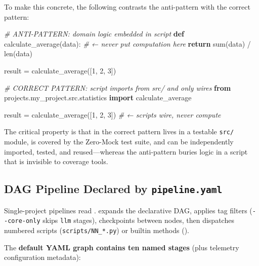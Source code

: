 \documentclass[
]{article}
\newenvironment{Shaded}{}{}
\newcommand{\BuiltInTok}[1]{\textcolor[rgb]{0.00,0.50,0.00}{#1}}
\newcommand{\CommentTok}[1]{\textcolor[rgb]{0.38,0.63,0.69}{\textit{#1}}}
\newcommand{\ControlFlowTok}[1]{\textcolor[rgb]{0.00,0.44,0.13}{\textbf{#1}}}
\newcommand{\DecValTok}[1]{\textcolor[rgb]{0.25,0.63,0.44}{#1}}
\newcommand{\ImportTok}[1]{\textcolor[rgb]{0.00,0.50,0.00}{\textbf{#1}}}
\newcommand{\KeywordTok}[1]{\textcolor[rgb]{0.00,0.44,0.13}{\textbf{#1}}}
\newcommand{\NormalTok}[1]{#1}
\newcommand{\OperatorTok}[1]{\textcolor[rgb]{0.40,0.40,0.40}{#1}}
\begin{document}
To make this concrete, the following contrasts the anti-pattern with the
correct pattern:

\begin{Shaded}
\begin{Highlighting}[]
\CommentTok{\# ANTI{-}PATTERN: domain logic embedded in script}
\KeywordTok{def}\NormalTok{ calculate\_average(data):          }\CommentTok{\# ← never put computation here}
    \ControlFlowTok{return} \BuiltInTok{sum}\NormalTok{(data) }\OperatorTok{/} \BuiltInTok{len}\NormalTok{(data)}

\NormalTok{result }\OperatorTok{=}\NormalTok{ calculate\_average([}\DecValTok{1}\NormalTok{, }\DecValTok{2}\NormalTok{, }\DecValTok{3}\NormalTok{])}

\CommentTok{\# CORRECT PATTERN: script imports from src/ and only wires}
\ImportTok{from}\NormalTok{ projects.my\_project.src.statistics }\ImportTok{import}\NormalTok{ calculate\_average}

\NormalTok{result }\OperatorTok{=}\NormalTok{ calculate\_average([}\DecValTok{1}\NormalTok{, }\DecValTok{2}\NormalTok{, }\DecValTok{3}\NormalTok{])  }\CommentTok{\# ← scripts wire, never compute}
\end{Highlighting}
\end{Shaded}

The critical property is that  in the correct
pattern lives in a testable \texttt{src/} module, is covered by the
Zero-Mock test suite, and can be independently imported, tested, and
reused---whereas the anti-pattern buries logic in a script that is
invisible to coverage tools.

\newpage

\subsection{\texorpdfstring{DAG Pipeline Declared by
\texttt{pipeline.yaml}}{DAG Pipeline Declared by pipeline.yaml}}\label{dag-pipeline-declared-by-pipeline.yaml}

Single-project pipelines read
.
 expands the declarative DAG,
applies tag filters (\texttt{-\/-core-only} skips \texttt{llm} stages),
checkpoints between nodes, then dispatches numbered scripts
(\texttt{scripts/NN\_*.py}) or builtin methods
().

The \textbf{default YAML graph contains ten named stages} (plus
telemetry configuration metadata):
\end{document}
